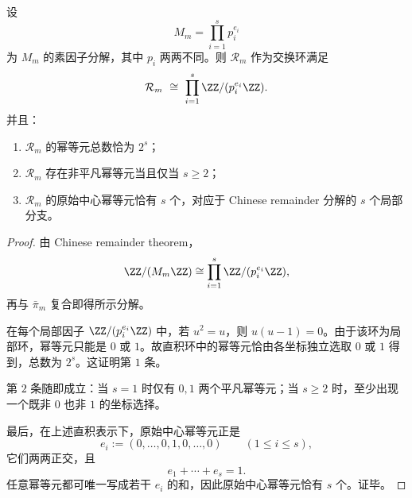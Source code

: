 \begin{theorem}\label{thm:xi-fold-congruence-crt-primitive-idempotents}
设
\[
M_m=\prod_{i=1}^{s}p_i^{e_i}
\]
为 \(M_m\) 的素因子分解，其中 \(p_i\) 两两不同。则 \(\mathcal R_m\) 作为交换环满足
\[
\mathcal R_m\ \cong\ \prod_{i=1}^{s}\ZZ/(p_i^{e_i}\ZZ).
\]
并且：
\begin{enumerate}
  \item \(\mathcal R_m\) 的幂等元总数恰为 \(2^s\)；
  \item \(\mathcal R_m\) 存在非平凡幂等元当且仅当 \(s\ge 2\)；
  \item \(\mathcal R_m\) 的原始中心幂等元恰有 \(s\) 个，对应于 Chinese remainder 分解的 \(s\) 个局部分支。
\end{enumerate}
\end{theorem}
\begin{proof}
由 Chinese remainder theorem，
\[
\ZZ/(M_m\ZZ)\cong \prod_{i=1}^{s}\ZZ/(p_i^{e_i}\ZZ),
\]
再与 \(\bar\pi_m\) 复合即得所示分解。

在每个局部因子 \(\ZZ/(p_i^{e_i}\ZZ)\) 中，若 \(u^2=u\)，则 \(u(u-1)=0\)。由于该环为局部环，幂等元只能是 \(0\) 或 \(1\)。故直积环中的幂等元恰由各坐标独立选取 \(0\) 或 \(1\) 得到，总数为 \(2^s\)。这证明第 \(1\) 条。

第 \(2\) 条随即成立：当 \(s=1\) 时仅有 \(0,1\) 两个平凡幂等元；当 \(s\ge 2\) 时，至少出现一个既非 \(0\) 也非 \(1\) 的坐标选择。

最后，在上述直积表示下，原始中心幂等元正是
\[
e_i:=(0,\dots,0,1,0,\dots,0)
\qquad(1\le i\le s),
\]
它们两两正交，且
\[
e_1+\cdots+e_s=1.
\]
任意幂等元都可唯一写成若干 \(e_i\) 的和，因此原始中心幂等元恰有 \(s\) 个。证毕。
\end{proof}

